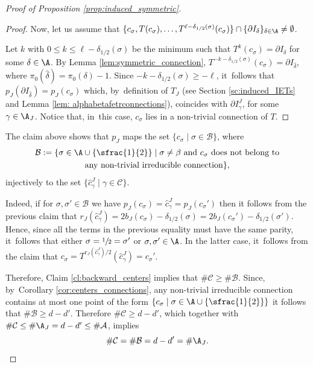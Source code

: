 \begin{proof}[Proof of Proposition \ref{prop:induced_symmetric}]
\begin{proof}
Now, let us assume that $\{c_\sigma, T(c_\sigma), \ldots, T^{\ell - \delta_{1/2}(\sigma)}(c_\sigma)\} \cap \{\partial I_\delta\}_{\delta \in \A} \neq \emptyset$.

Let $k$ with $0 \leq k \leq \ell - \delta_{1/2}(\sigma)$ be the minimum such that $T^k(c_\sigma) = \partial I _\delta$ for some $\delta \in \A$. By Lemma \ref{lem:symmetric_connection}, $T^{-k - \delta_{1/2}(\sigma)}(c_\sigma) = \partial I_{\hat \delta}$, where $\pi_0(\hat \delta) = \pi_0(\delta) - 1$. Since $-k - \delta_{1/2}(\sigma) \geq -\ell$, it~follows that $p_J(\partial I_{\hat \delta}) = p_J(c_\sigma)$ which, by~definition of $T_J$ (see Section \ref{sc:induced_IETs} and Lemma \ref{lem: alphabetafetrconnections}), coincides with $\partial I_\gamma^J$, for some $\gamma \in \A_J$. Notice that, in~this case, $c_\sigma$ lies in a non-trivial connection of $T$.
\end{proof}

The claim above shows that $p_J$ maps the set $\{c _\sigma \mid \sigma \in \mathcal B\}$, where
\begin{multline*}
\mathcal{B} := \{\sigma \in \A \cup \{\sfrac{1}{2}\} \mid \sigma \neq \beta \text{ and } c_\sigma \text{ does not belong to}\\
\text{any non-trivial irreducible connection}\},
\end{multline*}
injectively to the set $\{\hat c_\gamma^J \mid \gamma \in \mathcal C\}$.

Indeed, if for $\sigma, \sigma' \in \mathcal B$ we have $p_J(c_\sigma) = \hat c_\gamma^J = p_J(c_\sigma')$ then it follows from the previous claim that $r_J(\hat c_\gamma^J) = 2b_J(c_\sigma) - \delta_{1/2}(\sigma) = 2b_J(c_\sigma') - \delta_{1/2}(\sigma')$. Hence, since all the terms in the previous equality must have the same parity, it~follows that either $\sigma = \sfrac{1}{2} = \sigma'$ or $\sigma, \sigma' \in \A$. In the latter case, it~follows from the claim that $c_\sigma = T^{r_J( \hat c_\gamma^J)/2}(\hat c_\gamma^J) = c_\sigma'$.

Therefore, Claim \ref{cl:backward_centers} implies that $\# \mathcal C \geq \# \mathcal B$. Since, by~Corollary \ref{cor:centers_connections}, any non-trivial irreducible connection contains at most one point of the form $\{c_\sigma \mid \sigma \in \A \cup \{\sfrac{1}{2}\}\}$ it follows that $\#\mathcal B \geq d - d'$. Therefore $\#\mathcal C \geq d - d'$, which together with $\#\mathcal C\le\#\mathcal \A_J = d - d' \le\#\mathcal A$, implies
\[
\# \mathcal C = \#\mathcal B = d - d' = \# \A_J.\qedhere
\]
\end{proof}

